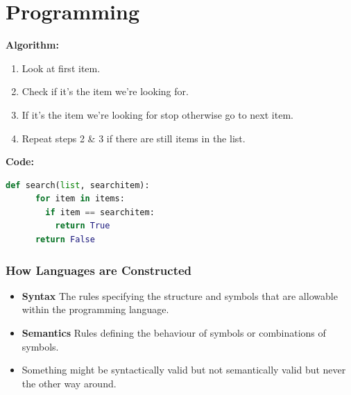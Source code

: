 \documentclass{beamer}
\begin{document}
%
%
\section{Programming}
\begin{frame}[fragile]
  \small 
  \begin{minipage}[t]{0.39\textwidth}
      \textbf{Algorithm:} \\
      \begin{enumerate}
        \item Look at first item.
        \item Check if it's the item we're looking for.
        \item If it's the item we're looking for stop otherwise go to next item.
        \item Repeat steps 2 \& 3 if there are still items in the list.
      \end{enumerate}
  \end{minipage}
  \begin{minipage}[t]{0.59\textwidth}
    \textbf{Code:}
    \begin{lstlisting}[language=Python]
    def search(list, searchitem):
      for item in items:
        if item == searchitem:
          return True
      return False
    \end{lstlisting}
    \hfill
  \end{minipage}
\end{frame}

%
%
\begin{frame}
  \frametitle{How Languages are Constructed}
  \begin{itemize}
    \item \textbf{Syntax} \textrightarrow The rules specifying the structure and symbols that are allowable within the programming language.
    \item \textbf{Semantics} \textrightarrow Rules defining the behaviour of symbols or combinations of symbols.
    \item Something might be syntactically valid but not semantically valid but never the other way around.
  \end{itemize}
\end{frame}
\end{document}
